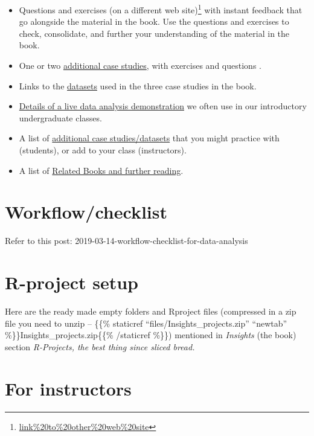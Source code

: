 \documentclass[]{book}
\providecommand{\tightlist}{%
  \setlength{\itemsep}{0pt}\setlength{\parskip}{0pt}}
\renewcommand{\href}[2]{#2\footnote{\url{#1}}}
\begin{document}
\begin{itemize}
\tightlist
\item
  \href{link\%20to\%20other\%20web\%20site}{Questions and exercises (on a different web site)} with instant feedback that go alongside the material in the book. Use the questions and exercises to check, consolidate, and further your understanding of the material in the book.
\item
  One or two \protect\hyperlink{more-case-studies}{additional case studies}, with exercises and questions .
\item
  Links to the \protect\hyperlink{datasets}{datasets} used in the three case studies in the book.
\item
  \protect\hyperlink{live-data-demo}{Details of a live data analysis demonstration} we often use in our introductory undergraduate classes.
\item
  A list of \protect\hyperlink{more-case-studies}{additional case studies/datasets} that you might practice with (students), or add to your class (instructors).
\item
  A list of \protect\hyperlink{related-books}{Related Books and further reading}.
\end{itemize}

\hypertarget{workflowchecklist}{%
\section{Workflow/checklist}\label{workflowchecklist}}

Refer to this post: 2019-03-14-workflow-checklist-for-data-analysis

\hypertarget{r-project-setup}{%
\section{R-project setup}\label{r-project-setup}}

Here are the ready made empty folders and Rproject files (compressed in a zip file you need to unzip -- \{\{\% staticref ``files/Insights\_projects.zip'' ``newtab'' \%\}\}Insights\_projects.zip\{\{\% /staticref \%\}\}) mentioned in \emph{Insights} (the book) section \emph{R-Projects, the best thing since sliced bread.}

\hypertarget{for-instructors}{%
\section{For instructors}\label{for-instructors}}
\end{document}
